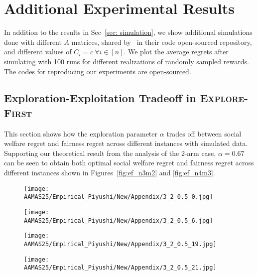 \section{Additional Experimental Results}
In addition to the results in Sec~\ref{sec: simulation}, we show additional simulations done with different $A$ matrices, shared by~\cite{Hossain2020FairAF} in their code open-sourced repository, and different values of $C_i=c\ \forall i\in [n]$. We plot the average regrets after simulating with 100 runs for different realizations of randomly sampled rewards. The codes for reproducing our experiments are \href{https://github.com/Piyushi-0/Fair-MAMAB}{open-sourced}.

\subsection{Exploration-Exploitation Tradeoff in \textsc{Explore-First}}\label{app:ef}
This section shows how the exploration parameter $\alpha$ trades off between social welfare regret and fairness regret across different instances with simulated data. Supporting our theoretical result from the analysis of the 2-arm case, $\alpha=0.67$ can be seen to obtain both optimal social welfare regret and fairness regret across different instances shown in Figures~\ref{fig:ef_n3m2} and \ref{fig:ef_n4m3}.
\begin{figure*}[ht!]
\centering
\begin{subfigure}{.24\textwidth}
    \centering
    \texttt{[image: AAMAS25/Empirical\_Piyushi/New/Appendix/3\_2\_0.5\_0.jpg]}  
    \label{ef3-1}
\end{subfigure}
\begin{subfigure}{.24\textwidth}
    \centering
    \texttt{[image: AAMAS25/Empirical\_Piyushi/New/Appendix/3\_2\_0.5\_6.jpg]}  
    \label{ef3-2}
\end{subfigure}
\begin{subfigure}{.24\textwidth}
    \centering
    \texttt{[image: AAMAS25/Empirical\_Piyushi/New/Appendix/3\_2\_0.5\_19.jpg]} 
    \label{ef3-3}
\end{subfigure}
\begin{subfigure}{.24\textwidth}
    \centering
    \texttt{[image: AAMAS25/Empirical\_Piyushi/New/Appendix/3\_2\_0.5\_21.jpg]} 
    \label{ef3-4}
\end{subfigure} 
\vspace{-0.15in}
    \caption{Explore-Exploit tradeoff on varying the exploration hyperparameter $\alpha$ (marked in legend). Different plots show different $A$ matrices with $n=3, m=2$. $C_i$ is $1/m\ \forall i \in [n]$. The values reported are averaged across 100 random runs with random seeds.}
    \label{fig:ef_n3m2}
\end{figure*} 

